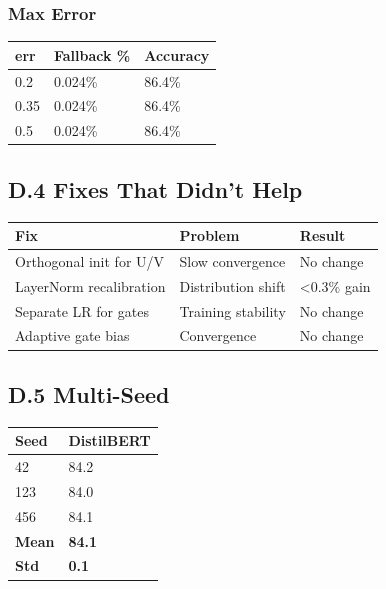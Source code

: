 \subsubsection{Max Error}

\begin{table}[H]
\centering
\small
\begin{tabular}{lll}
\toprule
\textbf{err} & \textbf{Fallback \%} & \textbf{Accuracy} \\
\midrule
0.2 & 0.024\% & 86.4\% \\
0.35 & 0.024\% & 86.4\% \\
0.5 & 0.024\% & 86.4\% \\
\bottomrule
\end{tabular}
\end{table}

\subsection{D.4 Fixes That Didn't Help}

\begin{table}[H]
\centering
\small
\begin{tabular}{lll}
\toprule
\textbf{Fix} & \textbf{Problem} & \textbf{Result} \\
\midrule
Orthogonal init for U/V & Slow convergence & No change \\
LayerNorm recalibration & Distribution shift & <0.3\% gain \\
Separate LR for gates & Training stability & No change \\
Adaptive gate bias & Convergence & No change \\
\bottomrule
\end{tabular}
\end{table}

\subsection{D.5 Multi-Seed}

\begin{table}[H]
\centering
\small
\begin{tabular}{ll}
\toprule
\textbf{Seed} & \textbf{DistilBERT} \\
\midrule
42 & 84.2 \\
123 & 84.0 \\
456 & 84.1 \\
\textbf{Mean} & \textbf{84.1} \\
\textbf{Std} & \textbf{0.1} \\
\bottomrule
\end{tabular}
\end{table}

